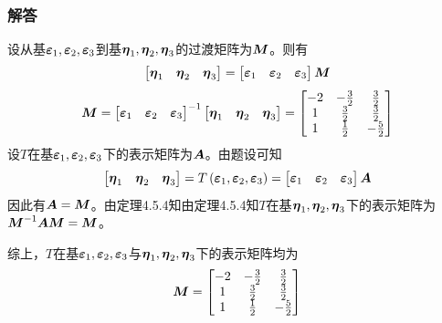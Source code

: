 \documentclass{beamer}
\begin{document}
\begin{frame}[allowframebreaks]
    \frametitle{解答}
    设从基\(\boldsymbol{\varepsilon}_1,\boldsymbol{\varepsilon}_2,\boldsymbol{\varepsilon}_3\)到基\(\boldsymbol{\eta}_1,\boldsymbol{\eta}_2,\boldsymbol{\eta}_3\)的过渡矩阵为\(\boldsymbol{M}\)。则有
    \begin{equation*}
        \begin{bmatrix}\boldsymbol{\eta}_1&\boldsymbol{\eta}_2&\boldsymbol{\eta}_3\end{bmatrix}=
        \begin{bmatrix}\boldsymbol{\varepsilon}_1&\boldsymbol{\varepsilon}_2&\boldsymbol{\varepsilon}_3\end{bmatrix}\boldsymbol{M}
    \end{equation*}
    \begin{equation*}
        \boldsymbol{M}={\begin{bmatrix}\boldsymbol{\varepsilon}_1&\boldsymbol{\varepsilon}_2&\boldsymbol{\varepsilon}_3\end{bmatrix}}^{-1}\begin{bmatrix}\boldsymbol{\eta}_1&\boldsymbol{\eta}_2&\boldsymbol{\eta}_3\end{bmatrix}=
        \begin{bmatrix}
            -2 & -\frac{3}{2} & \frac{3}{2}  \\
            1  & \frac{3}{2}  & \frac{3}{2}  \\
            1  & \frac{1}{2}  & -\frac{5}{2}
        \end{bmatrix}
    \end{equation*}
    设\(T\)在基\(\boldsymbol{\varepsilon}_1,\boldsymbol{\varepsilon}_2,\boldsymbol{\varepsilon}_3\)下的表示矩阵为\(\boldsymbol{A}\)。由题设可知
    \begin{equation*}
        \begin{bmatrix}\boldsymbol{\eta}_1&\boldsymbol{\eta}_2&\boldsymbol{\eta}_3\end{bmatrix}=T\left( \boldsymbol{\varepsilon}_1,\boldsymbol{\varepsilon}_2,\boldsymbol{\varepsilon}_3 \right)=\begin{bmatrix}\boldsymbol{\varepsilon}_1&\boldsymbol{\varepsilon}_2&\boldsymbol{\varepsilon}_3\end{bmatrix}\boldsymbol{A}
    \end{equation*}
    因此有\(\boldsymbol{A}=\boldsymbol{M}\)。由定理4.5.4知由定理4.5.4知\(T\)在基\(\boldsymbol{\eta}_1,\boldsymbol{\eta}_2,\boldsymbol{\eta}_3\)下的表示矩阵为\({\boldsymbol{M}}^{-1}\boldsymbol{A}\boldsymbol{M}=\boldsymbol{M}\)。

    综上，\(T\)在基\(\boldsymbol{\varepsilon}_1,\boldsymbol{\varepsilon}_2,\boldsymbol{\varepsilon}_3\)与\(\boldsymbol{\eta}_1,\boldsymbol{\eta}_2,\boldsymbol{\eta}_3\)下的表示矩阵均为
    \begin{equation*}
        \boldsymbol{M}=
        \begin{bmatrix}
            -2 & -\frac{3}{2} & \frac{3}{2}  \\
            1  & \frac{3}{2}  & \frac{3}{2}  \\
            1  & \frac{1}{2}  & -\frac{5}{2}
        \end{bmatrix}
    \end{equation*}
\end{frame}
\end{document}
